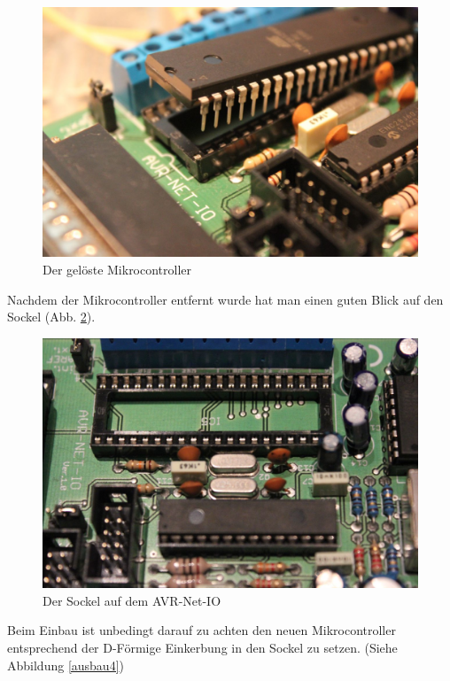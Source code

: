 \begin{figure}[H]
\centering
\includegraphics[width=13cm]{content/pictures/Anleitung/tauscheProzessor/2_Geloest.jpg}
\caption{Der gelöste Mikrocontroller}
\label{ausbau2}
\end{figure}

Nachdem der Mikrocontroller entfernt wurde hat man einen guten Blick auf den
Sockel (Abb. \ref{ausbau3}).

\begin{figure}[H]
\centering
\includegraphics[width=13cm]{content/pictures/Anleitung/tauscheProzessor/3_Sockel.jpg}
\caption{Der Sockel auf dem AVR-Net-IO}
\label{ausbau3}
\end{figure}

Beim Einbau ist unbedingt darauf zu achten den neuen Mikrocontroller entsprechend
der D-Förmige Einkerbung in den Sockel zu setzen. (Siehe Abbildung \ref{ausbau4})

